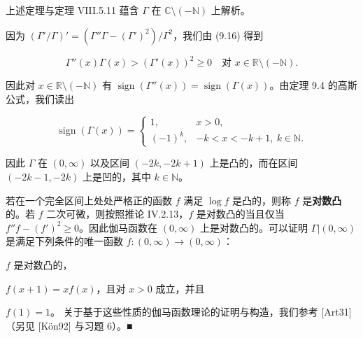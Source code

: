\begin{remark}

\begin{items}
\item

上述定理与定理 VIII.5.11 蕴含 $ \Gamma $ 在 $ \mathbb{C}\setminus(-\mathbb{N}) $ 上解析。

\item

因为 $ (\Gamma'/\Gamma)' = (\Gamma''\Gamma - (\Gamma')^{2})/\Gamma^{2} $，我们由 (9.16) 得到

\[
\Gamma''(x)\Gamma(x) > \left( \Gamma'(x) \right)^{2} \ge 0 \quad \text{对 } x \in \mathbb{R}\setminus(-\mathbb{N}) .
\]

因此对 $ x \in \mathbb{R}\setminus(-\mathbb{N}) $ 有 $ \operatorname{sign}(\Gamma''(x)) = \operatorname{sign}(\Gamma(x)) $。由定理 9.4 的高斯公式，我们读出

\begin{equation*}
\operatorname{sign}(\Gamma(x)) = \begin{cases} 1 , & x > 0 , \\ (-1)^{k} , & -k < x < -k+1 , \ k \in \mathbb{N} . \end{cases}
\end{equation*}

因此 $ \Gamma $ 在 $ (0, \infty) $ 以及区间 $ (-2k, -2k+1) $ 上是凸的，而在区间 $ (-2k-1, -2k) $ 上是凹的，其中 $ k \in \mathbb{N} $。

\end{items}


\begin{items}
\item[（c）]

若在一个完全区间上处处严格正的函数 $ f $ 满足 $ \log f $ 是凸的，则称 $ f $ 是\textbf{对数凸}的。若 $ f $ 二次可微，则按照推论 IV.2.13，$ f $ 是对数凸的当且仅当 $ f''f - (f')^{2} \ge 0 $。因此伽马函数在 $ (0, \infty) $ 上是对数凸的。可以证明 $ \Gamma|(0, \infty) $ 是满足下列条件的唯一函数 $ f : (0, \infty) \to (0, \infty) $：

\end{items}

\begin{subitems}
\item

$ f $ 是对数凸的，

\item

$ f(x+1) = xf(x) $，且对 $ x > 0 $ 成立，并且

\item

$ f(1) = 1 $。
关于基于这些性质的伽马函数理论的证明与构造，我们参考 [Art31]（另见 [Kön92] 与习题 6）。\nobreak\hspace{0.35em}■

\end{subitems}

\end{remark}

